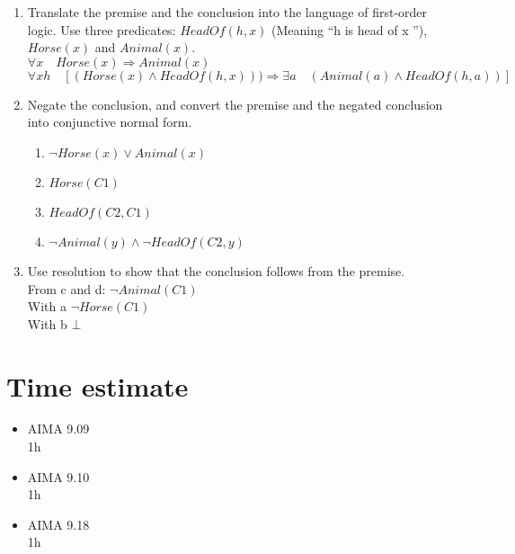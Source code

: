 \documentclass{scrartcl}
\begin{document}
\begin{enumerate}[label={\alph*)}] 
	\item Translate the premise and the conclusion into the language of first-order logic. Use three predicates: $HeadOf(h, x)$ (Meaning “h is head of x ”), $Horse(x)$ and $Animal(x)$.\\
	$\forall x\quad Horse(x) \Rightarrow Animal(x) $\\
	$\forall x h\quad [(Horse(x)\land HeadOf(h, x)))\Rightarrow \exists a \quad (Animal(a)\land HeadOf(h, a))]$
	
	\item Negate the conclusion, and convert the premise and the negated conclusion into conjunctive normal form.\\
	\begin{enumerate}
		\item $\neg Horse(x) \lor Animal(x)$
		\item $Horse(C1)$
		\item $HeadOf(C2, C1)$
		\item $\neg Animal(y)\land \neg HeadOf(C2, y)$
 	\end{enumerate}
	
	\item Use resolution to show that the conclusion follows from the premise.\\
	From c and d: $\neg Animal(C1)$\\
	With a $\neg Horse(C1)$\\
	With b $\bot$
\end{enumerate}


\section{Time estimate}
\begin{itemize}
	\item AIMA 9.09\\
	1h
	\item AIMA 9.10\\
	1h
	\item AIMA 9.18\\
	 1h
\end{itemize}

	
\end{document}
